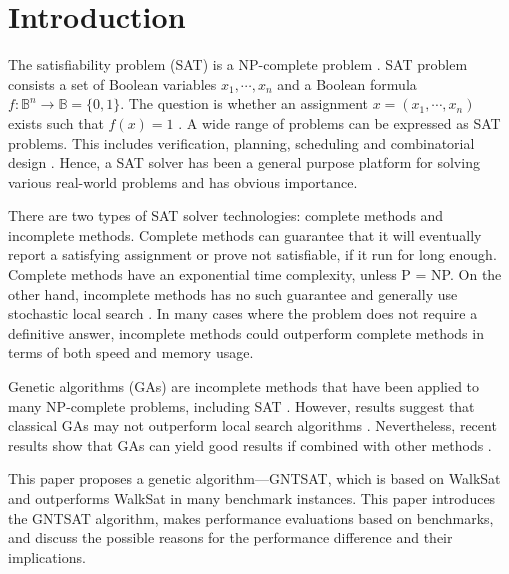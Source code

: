 \section {Introduction}
The satisfiability problem (SAT) is a NP-complete problem
\cite{cook_1971}. SAT problem consists a set of Boolean variables
$x_1, \cdots, x_n$ and a Boolean formula $f: \mathbb{B}^n \rightarrow \mathbb{B}=\{0, 1\}$. The
question is whether an assignment $x=(x_1, \cdots, x_n)$ exists such that
$f(x)=1$ \cite{gottlieb_marchiori_rossi_2002}. A wide range of problems can be
expressed as SAT problems. This includes verification, planning, scheduling
and combinatorial design \cite{biere2009handbook}. Hence, a SAT solver has been a
general purpose platform for solving various real-world problems and has
obvious importance.

There are two types of SAT solver technologies: complete methods and
incomplete methods. Complete methods can guarantee that it will eventually
report a satisfying assignment or prove not satisfiable, if it run for long
enough. Complete methods have an exponential time complexity, unless P = NP.
On the other hand, incomplete methods has no such guarantee and generally use
stochastic local search \cite{gomes_kautz_sabharwal_selman_2008}. In many cases where the problem
does not require a definitive answer, incomplete methods could outperform
complete methods in terms of both speed and memory usage.

Genetic algorithms (GAs) are incomplete methods that have been applied to many
NP-complete problems, including SAT \cite{gottlieb_marchiori_rossi_2002}. However, results
suggest that classical GAs may not outperform local search algorithms
\cite{de1989using}. Nevertheless, recent results show that GAs can yield
good results if combined with other methods \cite{gottlieb_marchiori_rossi_2002}.

This paper proposes a genetic algorithm---GNTSAT, which is based on WalkSat
\cite{selman1994noise} and outperforms WalkSat in many benchmark instances.
This paper introduces the GNTSAT algorithm, makes performance evaluations
based on benchmarks, and discuss the possible reasons for the performance
difference and their implications.
